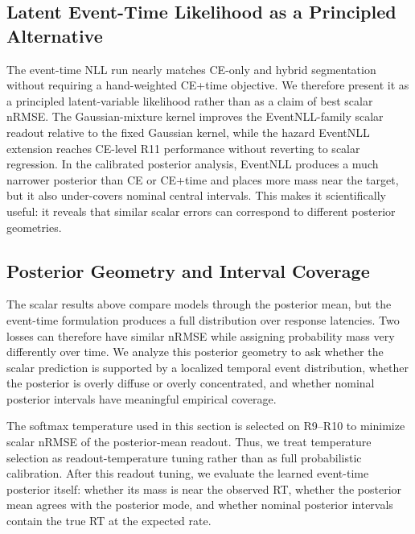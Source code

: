 \documentclass[12pt]{article}
\begin{document}
\subsection{Latent Event-Time Likelihood as a Principled Alternative}

The event-time NLL run nearly matches CE-only and hybrid segmentation without requiring a hand-weighted CE+time objective. We therefore present it as a principled latent-variable likelihood rather than as a claim of best scalar nRMSE. The Gaussian-mixture kernel improves the EventNLL-family scalar readout relative to the fixed Gaussian kernel, while the hazard EventNLL extension reaches CE-level R11 performance without reverting to scalar regression. In the calibrated posterior analysis, EventNLL produces a much narrower posterior than CE or CE+time and places more mass near the target, but it also under-covers nominal central intervals. This makes it scientifically useful: it reveals that similar scalar errors can correspond to different posterior geometries.
\subsection{Posterior Geometry and Interval Coverage}

The scalar results above compare models through the posterior mean, but the event-time formulation produces a full distribution over response latencies. Two losses can therefore have similar nRMSE while assigning probability mass very differently over time. We analyze this posterior geometry to ask whether the scalar prediction is supported by a localized temporal event distribution, whether the posterior is overly diffuse or overly concentrated, and whether nominal posterior intervals have meaningful empirical coverage.

The softmax temperature used in this section is selected on R9--R10 to minimize scalar nRMSE of the posterior-mean readout. Thus, we treat temperature selection as readout-temperature tuning rather than as full probabilistic calibration. After this readout tuning, we evaluate the learned event-time posterior itself: whether its mass is near the observed RT, whether the posterior mean agrees with the posterior mode, and whether nominal posterior intervals contain the true RT at the expected rate.
\end{document}
